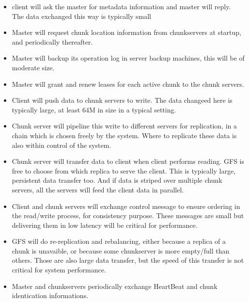 \begin{itemize}
\item{}
client will ask the master for metadata information and master will reply. The data exchanged this way is typically small 

\item{}
Master will request chunk location information from chunkservers at startup, and periodically thereafter.

\item{}
Master will backup its operation log in server backup machines, this will be of moderate size.

\item{}
Master will grant and renew leases for each active chunk to the chunk servers.

\item{}
Client will push data to chunk servers to write. The data changeed here is typically large, at least 64M in size in a typical setting.

\item{}
Chunk server will pipeline this write to different servers for replication, in a chain which is chosen freely by the system. Where to replicate these data is also within control of the system.

\item{}
Chunk server will transfer data to client when client performs reading. GFS is free to choose from which replica to serve the client. This is typically large, persistent data transfer too. And if data is striped over multiple chunk servers, all the servers will feed the client data in parallel.

\item{}
Client and chunk servers will exchange control message to ensure ordering in the read/write process, for consistency purpose. These messages are small but delivering them in low latency will be critical for performance.

\item{}
GFS will do re-replication and rebalancing, either because a replica of a chunk is unavaible, or because some chunkserver is more empty/full than others. Those are also large data transfer, but the speed of this transfer is not critical for system performance.

\item{}
Master and chunkservers periodically exchange HeartBeat and chunk identication informations.

\end{itemize}
